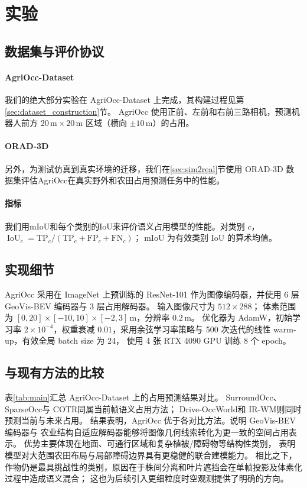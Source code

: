 \documentclass[a4paper,fleqn]{cas-sc}
\newcommand{\IoU}{\operatorname{IoU}}
\begin{document}
\section{实验}\label{sec:experiments}

\subsection{数据集与评价协议}\label{sec:data}
\paragraph{AgriOcc-Dataset}
我们的绝大部分实验在 AgriOcc-Dataset 上完成，其构建过程见第\ref{sec:dataset_construction}节。
AgriOcc 使用正前、左前和右前三路相机，预测机器人前方 $20\,\mathrm{m}\times20\,\mathrm{m}$
区域（横向 $\pm10\,$m）的占用。

\paragraph{ORAD-3D}
另外，为测试仿真到真实环境的迁移，我们在\ref{sec:sim2real}节使用 ORAD-3D 数据集\citep{chen2025orad3d}评估AgriOcc在真实野外和农田占用预测任务中的性能。

\paragraph{指标}
我们用mIoU和每个类别的IoU来评价语义占用模型的性能。对类别 $c$，$\IoU_c=\mathrm{TP}_c/(\mathrm{TP}_c+\mathrm{FP}_c+\mathrm{FN}_c)$；
mIoU 为有效类别 IoU 的算术均值。

\subsection{实现细节}\label{sec:implementation}
AgriOcc 采用在 ImageNet 上预训练的 ResNet-101 作为图像编码器，并使用 6 层 GeoVis-BEV 编码器与 3 层占用解码器。
输入图像尺寸为 $512\times288$；
体素范围为 $[0,20]\times[-10,10]\times[-2,3]\,\mathrm{m}$，分辨率 $0.2\,\mathrm{m}$。
优化器为 AdamW，初始学习率 $2\times10^{-4}$，权重衰减 $0.01$，采用余弦学习率策略与
500 次迭代的线性 warm-up，有效全局 batch size 为 24，
使用 4 张 RTX 4090 GPU 训练 8 个 epoch。

\subsection{与现有方法的比较}\label{sec:comparison}
表\ref{tab:main}汇总 AgriOcc-Dataset 上的占用预测结果对比。
SurroundOcc\citep{wei2023surroundocc}、SparseOcc\citep{tang2024sparseocc}与 COTR\citep{ma2024cotr}同属当前帧语义占用方法；
Drive-OccWorld\citep{yangDrivingOccupancyWorld2025}和 IR-WM\citep{meiVisionCentric4DOccupancy2026}则同时预测当前与未来占用。
结果表明，AgriOcc 优于各对比方法。说明 GeoVis-BEV 编码器与
农业结构自适应解码器能够将图像几何线索转化为更一致的空间占用表示。
优势主要体现在地面、可通行区域和复杂植被/障碍物等结构性类别，
表明模型对大范围农田布局与局部障碍边界具有更稳健的联合建模能力。
相比之下，作物仍是最具挑战性的类别，原因在于株间分离和叶片遮挡会在单帧投影及体素化过程中造成语义混合；
这也为后续引入更细粒度时空观测提供了明确的方向。
\end{document}
